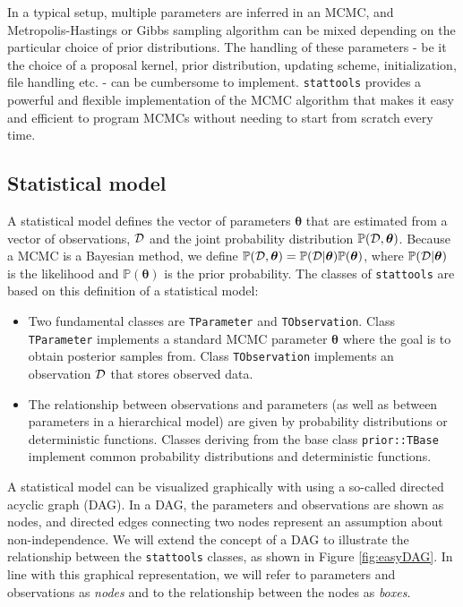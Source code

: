 \documentclass[a4paper,11pt]{article}
\def\btheta{\boldsymbol{\theta}}
\def\D{{\cal D}}
\def\p{\mathbb{P}}
\def\stattools{\texttt{stattools}}
\newcommand{\class}[1]{\texttt{#1}}
\begin{document}
In a typical setup, multiple parameters are inferred in an MCMC, and Metropolis-Hastings or Gibbs sampling algorithm can be mixed depending on the particular choice of prior distributions. The handling of these parameters - be it the choice of a proposal kernel, prior distribution, updating scheme, initialization, file handling etc. - can be cumbersome to implement. \stattools{} provides a powerful and flexible implementation of the MCMC algorithm that makes it easy and efficient to program MCMCs without needing to start from scratch every time.

\subsection{Statistical model}
A statistical model defines the vector of parameters $\btheta$ that are estimated from a vector of observations, $\D$ and the joint probability distribution $\p(\D, \btheta)$. Because a MCMC is a Bayesian method, we define $\p(\D, \btheta) = \p(\D | \btheta)\p(\btheta)$, where $\p(\D | \btheta)$ is the likelihood and $\p(\btheta)$ is the prior probability. The classes of \stattools{} are based on this definition of a statistical model:
\begin{itemize}
 \item Two fundamental classes are \class{TParameter} and \class{TObservation}. Class \class{TParameter} implements a standard MCMC parameter $\btheta$ where the goal is to obtain posterior samples from. Class \class{TObservation} implements an observation $\D$ that stores observed data.
 \item The relationship between observations and parameters (as well as between parameters in a hierarchical model) are given by probability distributions or deterministic functions. Classes deriving from the base class \class{prior::TBase} implement common probability distributions and deterministic functions.
\end{itemize}

A statistical model can be visualized graphically with using a so-called directed acyclic graph (DAG). In a DAG, the parameters and observations are shown as nodes, and directed edges connecting two nodes represent an assumption about non-independence. We will extend the concept of a DAG to illustrate the relationship between the \stattools{} classes, as shown in Figure \ref{fig:easyDAG}. In line with this graphical representation, we will refer to parameters and observations as \textit{nodes} and to the relationship between the nodes as \textit{boxes}.
\end{document}
